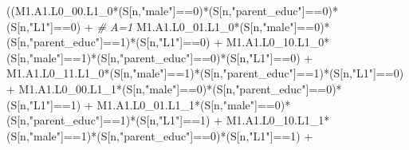 \documentclass[
]{book}
\newenvironment{Shaded}{\begin{snugshade}}{\end{snugshade}}
\newcommand{\CommentTok}[1]{\textcolor[rgb]{0.56,0.35,0.01}{\textit{#1}}}
\newcommand{\DecValTok}[1]{\textcolor[rgb]{0.00,0.00,0.81}{#1}}
\newcommand{\NormalTok}[1]{#1}
\newcommand{\SpecialCharTok}[1]{\textcolor[rgb]{0.00,0.00,0.00}{#1}}
\newcommand{\StringTok}[1]{\textcolor[rgb]{0.31,0.60,0.02}{#1}}
\begin{document}
\begin{Shaded}
\begin{Highlighting}[]
\NormalTok{      ((M1.A1.L0\_00.L1\_0}\SpecialCharTok{*}\NormalTok{(S[n,}\StringTok{"male"}\NormalTok{]}\SpecialCharTok{==}\DecValTok{0}\NormalTok{)}\SpecialCharTok{*}\NormalTok{(S[n,}\StringTok{"parent\_educ"}\NormalTok{]}\SpecialCharTok{==}\DecValTok{0}\NormalTok{)}\SpecialCharTok{*}\NormalTok{(S[n,}\StringTok{"L1"}\NormalTok{]}\SpecialCharTok{==}\DecValTok{0}\NormalTok{) }\SpecialCharTok{+} \CommentTok{\# A\textquotesingle{}=1             }
\NormalTok{          M1.A1.L0\_01.L1\_0}\SpecialCharTok{*}\NormalTok{(S[n,}\StringTok{"male"}\NormalTok{]}\SpecialCharTok{==}\DecValTok{0}\NormalTok{)}\SpecialCharTok{*}\NormalTok{(S[n,}\StringTok{"parent\_educ"}\NormalTok{]}\SpecialCharTok{==}\DecValTok{1}\NormalTok{)}\SpecialCharTok{*}\NormalTok{(S[n,}\StringTok{"L1"}\NormalTok{]}\SpecialCharTok{==}\DecValTok{0}\NormalTok{) }\SpecialCharTok{+}
\NormalTok{          M1.A1.L0\_10.L1\_0}\SpecialCharTok{*}\NormalTok{(S[n,}\StringTok{"male"}\NormalTok{]}\SpecialCharTok{==}\DecValTok{1}\NormalTok{)}\SpecialCharTok{*}\NormalTok{(S[n,}\StringTok{"parent\_educ"}\NormalTok{]}\SpecialCharTok{==}\DecValTok{0}\NormalTok{)}\SpecialCharTok{*}\NormalTok{(S[n,}\StringTok{"L1"}\NormalTok{]}\SpecialCharTok{==}\DecValTok{0}\NormalTok{) }\SpecialCharTok{+} 
\NormalTok{          M1.A1.L0\_11.L1\_0}\SpecialCharTok{*}\NormalTok{(S[n,}\StringTok{"male"}\NormalTok{]}\SpecialCharTok{==}\DecValTok{1}\NormalTok{)}\SpecialCharTok{*}\NormalTok{(S[n,}\StringTok{"parent\_educ"}\NormalTok{]}\SpecialCharTok{==}\DecValTok{1}\NormalTok{)}\SpecialCharTok{*}\NormalTok{(S[n,}\StringTok{"L1"}\NormalTok{]}\SpecialCharTok{==}\DecValTok{0}\NormalTok{) }\SpecialCharTok{+}
\NormalTok{          M1.A1.L0\_00.L1\_1}\SpecialCharTok{*}\NormalTok{(S[n,}\StringTok{"male"}\NormalTok{]}\SpecialCharTok{==}\DecValTok{0}\NormalTok{)}\SpecialCharTok{*}\NormalTok{(S[n,}\StringTok{"parent\_educ"}\NormalTok{]}\SpecialCharTok{==}\DecValTok{0}\NormalTok{)}\SpecialCharTok{*}\NormalTok{(S[n,}\StringTok{"L1"}\NormalTok{]}\SpecialCharTok{==}\DecValTok{1}\NormalTok{) }\SpecialCharTok{+}
\NormalTok{          M1.A1.L0\_01.L1\_1}\SpecialCharTok{*}\NormalTok{(S[n,}\StringTok{"male"}\NormalTok{]}\SpecialCharTok{==}\DecValTok{0}\NormalTok{)}\SpecialCharTok{*}\NormalTok{(S[n,}\StringTok{"parent\_educ"}\NormalTok{]}\SpecialCharTok{==}\DecValTok{1}\NormalTok{)}\SpecialCharTok{*}\NormalTok{(S[n,}\StringTok{"L1"}\NormalTok{]}\SpecialCharTok{==}\DecValTok{1}\NormalTok{) }\SpecialCharTok{+}
\NormalTok{          M1.A1.L0\_10.L1\_1}\SpecialCharTok{*}\NormalTok{(S[n,}\StringTok{"male"}\NormalTok{]}\SpecialCharTok{==}\DecValTok{1}\NormalTok{)}\SpecialCharTok{*}\NormalTok{(S[n,}\StringTok{"parent\_educ"}\NormalTok{]}\SpecialCharTok{==}\DecValTok{0}\NormalTok{)}\SpecialCharTok{*}\NormalTok{(S[n,}\StringTok{"L1"}\NormalTok{]}\SpecialCharTok{==}\DecValTok{1}\NormalTok{) }\SpecialCharTok{+}

\end{Highlighting}
\end{Shaded}
\end{document}

